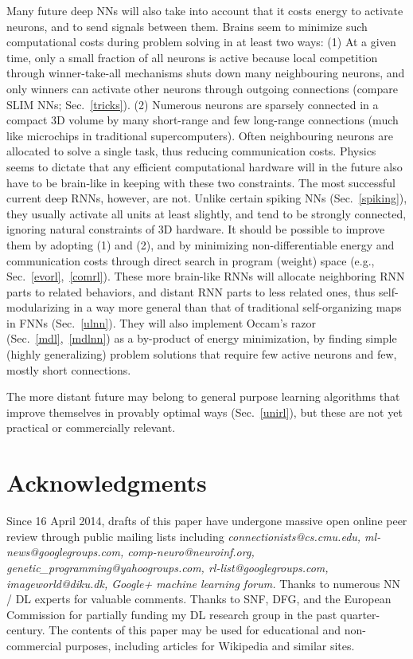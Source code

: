 \documentclass[letterpaper]{article}
\begin{document}
\begin{CJK*}{UTF8}{gbsn}
Many future deep NNs will also take into account that it costs energy
to activate neurons, and to send signals between them. Brains seem to
minimize such computational costs during problem solving in at least
two ways: (1) At a given time, only a small fraction of all neurons is
active because local competition through winner-take-all mechanisms
shuts down many neighbouring neurons, and only winners can activate
other neurons through outgoing connections (compare SLIM NNs;
Sec.~\ref{tricks}). (2) Numerous neurons are sparsely connected in a
compact 3D volume by many short-range and few long-range connections
(much like microchips in traditional supercomputers). Often
neighbouring neurons are allocated to solve a single task, thus
reducing communication costs.  Physics seems to dictate that any
efficient computational hardware will in the future also have to be
brain-like in keeping with these two constraints. The most successful
current deep RNNs, however, are not. Unlike certain spiking NNs
(Sec.~\ref{spiking}), they usually activate all units at least slightly,
and tend to be strongly connected, ignoring natural constraints of 3D
hardware. It should be possible to improve them by adopting (1) and
(2), and by minimizing non-differentiable energy and communication
costs through direct search in program (weight) space (e.g.,
Sec.~\ref{evorl},~\ref{comrl}).  These more brain-like RNNs will
allocate neighboring RNN parts to related behaviors, and distant RNN
parts to less related ones, thus self-modularizing in a way more
general than that of traditional self-organizing maps in FNNs
(Sec.~\ref{ulnn}). They will also implement Occam's razor
(Sec.~\ref{mdl},~\ref{mdlnn}) as a by-product of energy minimization,
by finding simple (highly generalizing) problem solutions that require
few active neurons and few, mostly short connections.

The more distant future may belong to general purpose learning
algorithms that improve themselves in provably optimal ways
(Sec.~\ref{unirl}), but these are not yet practical or commercially
relevant.
 



\section{Acknowledgments}
\label{ack}


Since 16 April 2014, drafts of this paper have undergone massive open online peer review through public mailing lists including 
{\em connectionists\-@cs.cmu.edu, ml-news\-@googlegroups.com, comp-neuro\-@neuro\-inf.org, genetic\_pro\-gramming\-@yahoo\-groups.com, rl-list\-@googlegroups.com, image\-world\-@diku.dk, Google+ machine learning forum.} 
Thanks to numerous NN / DL experts for valuable comments. Thanks to SNF, DFG, and the European Commission for partially funding my DL research group in the past quarter-century.
The contents of this paper may be used for educational and non-commercial purposes, including articles for Wikipedia and similar sites.




%
%
%
%
%
\end{CJK*}
\end{document}

